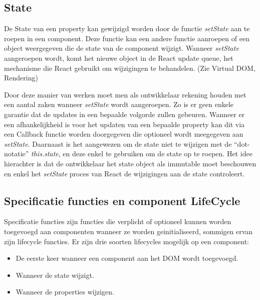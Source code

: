 	\subsection{State}
		
		De State van een property kan gewijzigd worden door de functie \emph{setState} aan te roepen in een component. Deze functie kan een andere functie aanroepen of een object weergegeven die de state van de component wijzigt. Wanneer \emph{setState} aangeroepen wordt, komt het nieuwe object in de React update queue, het mechanisme die React gebruikt om wijzigingen te behandelen. (Zie Virtual DOM, Rendering)
		
		Door deze manier van werken moet men als ontwikkelaar rekening houden met een aantal zaken wanneer \emph{setState} wordt aangeroepen. Zo is er geen enkele garantie dat de updates in een bepaalde volgorde zullen gebeuren. Wanneer er een afhankelijkheid is voor het updaten van een bepaalde property kan dit via een Callback functie worden doorgegeven die optioneel wordt meegegeven aan \emph{setState}. Daarnaast is het aangewezen om de state niet te wijzigen met de ``dot-notatie'' \emph{this.state}, en deze enkel te gebruiken om de state op te roepen. Het idee hierachter is dat de ontwikkelaar het state object als immutable moet beschouwen en enkel het \emph{setState} proces van React de wijzigingen aan de state controleert.
	
	\subsection{Specificatie functies en component LifeCycle}
		
		Specificatie functies zijn functies die verplicht of optioneel kunnen worden toegevoegd aan componenten wanneer ze worden geinitialiseerd, sommigen ervan zijn lifecycle functies. Er zijn drie soorten lifecycles mogelijk op een component:
		
		\begin{itemize}
			\item De eerste keer wanneer een component aan het DOM wordt toegevoegd.
			\item Wanneer de state wijzigt.
			\item Wanneer de properties wijzigen.
		\end{itemize}
		
